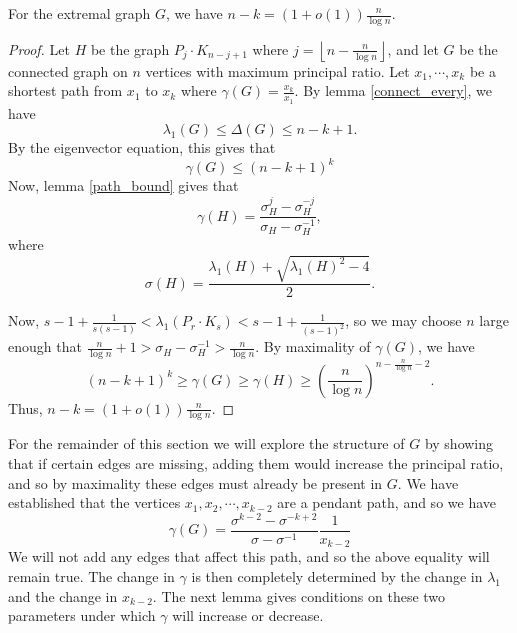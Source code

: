 \begin{lemma}\label{s_range}
For the extremal graph $G$, we have $n-k = (1+o(1))\frac{n}{\log n}$.
\end{lemma}
\begin{proof}
Let $H$ be the graph $P_j \cdot K_{n-j+1}$ where $ j = \left\lfloor n - \frac{n}{\log n}\right\rfloor$, and let $G$ be the connected graph on $n$ vertices with maximum principal ratio. Let $x_1,\cdots, x_k$ be a shortest path from $x_1$ to $x_k$ where $\gamma(G) = \frac{x_k}{x_1}$. By lemma \ref{connect_every}, we have
\[
\lambda_1(G) \leq \Delta(G) \leq n-k+1.
\]
By the eigenvector equation, this gives that
\begin{equation}\label{gamma of G}
\gamma(G) \leq (n-k+1)^k
\end{equation}
Now, lemma \ref{path_bound} gives that
\[
\gamma(H)  = \frac{\sigma_H^j - \sigma_H^{-j}}{\sigma_H - \sigma_H^{-1}},
\]
where
\[
\sigma(H) = \frac{\lambda_1(H) + \sqrt{\lambda_1(H)^2 -4}}{2}.
\]

Now, $s-1 + \frac{1}{s(s-1)} < \lambda_1(P_r\cdot K_s) < s-1 + \frac{1}{(s-1)^2}$, so we may choose $n$ large enough that $\frac{n}{\log n} + 1 >\sigma_H - \sigma_H^{-1} > \frac{n}{\log n}$. By maximality of $\gamma(G)$, we have
\[
(n-k+1)^k \geq \gamma(G) \geq \gamma(H) \geq \left(\frac{n}{\log n}\right)^{n-\frac{n}{\log n} - 2}.
\]
Thus, $n- k = (1+o(1))\frac{n}{\log n}$.
\end{proof}

For the remainder of this section we will explore the structure of $G$ by
showing that if certain edges are missing, adding them would increase
the principal ratio, and so by maximality these edges must already be
present in $G$.  We have established that the vertices $x_1, x_2, \cdots, x_{k-2}$
are a pendant path, and so we have
\begin{equation}\label{pr_form}
 \gamma(G) = \frac{\sigma^{k-2} - \sigma^{-k+2}}{\sigma-\sigma^{-1}} \frac{1}{x_{k-2}}
\end{equation}
We will not add any edges that affect this path, and so the above equality will
remain true.   
The change in $\gamma$ is then completely determined by the change
in $\lambda_1$ and the change in $x_{k-2}$.  The next lemma gives conditions
on these two parameters under which $\gamma$ will increase or decrease.

